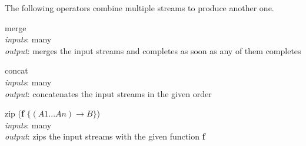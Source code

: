 \documentclass{dithesis}
\begin{document}
The following operators combine multiple streams to produce another one.
\begin{description}

\begin{minipage}[c]{0.4\linewidth}
\item[merge] ~\\
	\textit{inputs}: many \\
	\textit{output}: merges the input streams and completes as soon as any of them completes
\end{minipage}
\begin{minipage}[c]{0.6\linewidth}

\end{minipage}

\begin{minipage}[c]{0.4\linewidth}
\item[concat] ~\\
	\textit{inputs}: many \\
	\textit{output}: concatenates the input streams in the given order
\end{minipage}
\begin{minipage}[c]{0.6\linewidth}

\end{minipage}

\begin{minipage}[c]{0.4\linewidth}
\item[zip] (\textbf{f} $\{ (A1...An) \to B \}$) \\
	\textit{inputs}: many \\
	\textit{output}: zips the input streams with the given function \textbf{f}
\end{minipage}
\begin{minipage}[c]{0.6\linewidth}

\end{minipage}

\end{description}
\end{document}
